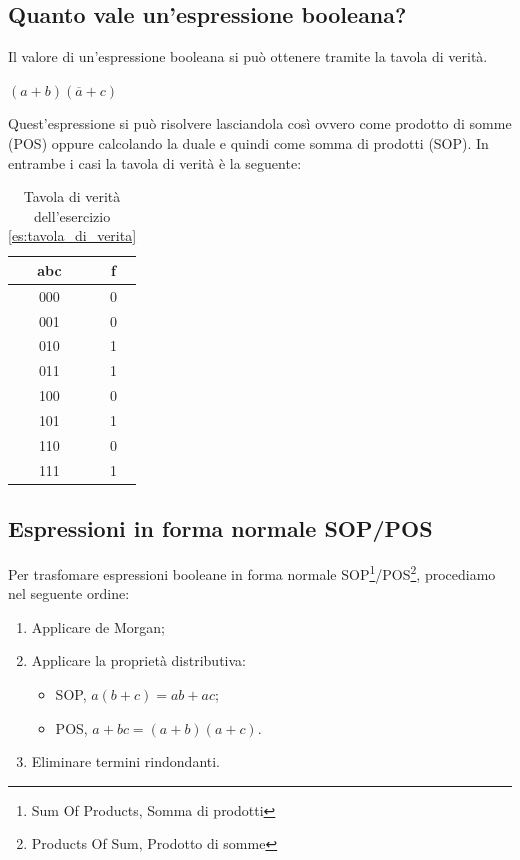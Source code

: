 \subsection*{Quanto vale un'espressione booleana?}
Il valore di un'espressione booleana si può ottenere tramite la tavola di verità.
\begin{exercise}\label{es:tavola_di_verita}
    $(a+b)(\overline{a}+c)$
    
    Quest'espressione si può risolvere lasciandola così ovvero come prodotto di somme (POS) oppure calcolando la duale e quindi come somma di prodotti (SOP).
    In entrambe i casi la tavola di verità è la seguente:
    \begin{table}[ht]
        \centering
        \begin{tabular}{|c|c|}
            \hline abc & f\\\hline\hline
            000 & 0\\\hline
            001 & 0\\\hline
            010 & 1\\\hline
            011 & 1\\\hline
            100 & 0\\\hline
            101 & 1\\\hline
            110 & 0\\\hline
            111 & 1\\\hline
        \end{tabular}
        \caption{Tavola di verità dell'esercizio \ref{es:tavola_di_verita}}
        \label{tab:my_label}
    \end{table}
\end{exercise}

\subsection{Espressioni in forma normale SOP/POS}
Per trasfomare espressioni booleane in forma normale SOP\footnote{Sum Of Products, Somma di prodotti}/POS\footnote{{Products Of Sum, Prodotto di somme}}, procediamo nel seguente ordine:
\begin{enumerate}
    \item Applicare de Morgan;
    \item Applicare la proprietà distributiva:
    \begin{itemize}
        \item SOP, $a(b+c)=ab+ac$;
        \item POS, $a+bc=(a+b)(a+c)$.
    \end{itemize}
    \item Eliminare termini rindondanti.
\end{enumerate}

